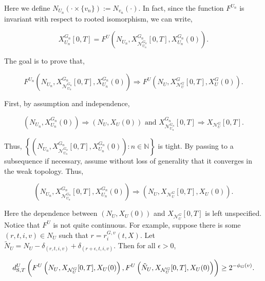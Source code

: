 \documentclass[12pt]{article}
\newcommand{\mb}{\mathbb}
\newcommand{\mc}{\mathcal}
\newcommand{\te}{\text}
\newcommand{\ep}{\epsilon}
\newcommand{\defeq}{:=}								%
\newcommand{\gneigh}[2]{\mc{N}^{#1}_{#2}}			%
\newcommand{\Xf}{X}									%
\newcommand{\poiss}{N}								%
\newcommand{\rate}{r}								%
\newcommand{\stmet}[1]{
\ifstrempty{#1}{
	d_{\te{S}}}{
	d_{\te{S},#1}}}									%
\newcommand{\poissv}[1]{_{#1}}						%
\newcommand{\vind}[1]{_{#1}}						%
\newcommand{\tme}[1]{(#1)}							%
\newcommand{\tmi}[1]{#1}							%
\newcommand{\gind}[1]{^{#1}}						%
\newcommand{\vpara}[1]{^{#1}}						%
\newcommand{\stpara}[1]{_{#1}}						%
\newcommand{\gvpara}[2]{^{#1,#2}}					%
\newcommand{\tmepro}[2]{(#1,#2)}					%
\newcommand{\alt}[1]{\tilde{#1}}					%
\renewcommand{\it}[1]{_{#1}}						%
\begin{document}
Here we define \(\poiss\poissv{U\it{n}}(\cdot\times \{v\it{n}\}) \defeq \poiss\poissv{v\it{n}}(\cdot)\). In fact, since the function \(F\vpara{U\it{n}}\) is invariant with respect to rooted isomorphism, we can write,

\[\Xf\gind{G\it{n}}\vind{U\it{n}}\tmi{[0,T]} = F\vpara{U}\left(\poiss\poissv{U\it{n}}, \Xf\gind{G\it{n}}\vind{\gneigh{G\it{n}}{U\it{n}}}\tmi{[0,T]}, \Xf\gind{G\it{n}}\vind{U\it{n}}\tme{0}\right).\]

The goal is to prove that,

\[F\vpara{U\it{n}}\left(\poiss\poissv{U\it{n}}, \Xf\gind{G\it{n}}\vind{\gneigh{G\it{n}}{U\it{n}}}\tmi{[0,T]}, \Xf\gind{G\it{n}}\vind{U\it{n}}\tme{0}\right) \Rightarrow F\vpara{U}\left(\poiss\poissv{U}, \Xf\gind{G}\vind{\gneigh{G}{U}}\tmi{[0,T]}, \Xf\gind{G}\vind{U}\tme{0}\right).\]

First, by assumption and independence,

\[\left(\poiss\poissv{U\it{n}},\Xf\gind{G\it{n}}\vind{U\it{n}}\tme{0}\right) \Rightarrow\left(\poiss\poissv{U},\Xf\vind{U}\tme{0}\right)\te{ and } \Xf\gind{G\it{n}}\vind{\gneigh{G\it{n}}{U\it{n}}}\tmi{[0,T]} \Rightarrow \Xf\vind{\gneigh{G}{U}}\tmi{[0,T]}.\]

Thus, \(\left\{\left(\poiss\poissv{U\it{n}},\Xf\gind{G\it{n}}\vind{\gneigh{G\it{n}}{U\it{n}}}\tmi{[0,T]},\Xf\gind{G\it{n}}\vind{U\it{n}}\tme{0}\right): n \in \mb{N}\right\}\) is tight. By passing to a subsequence if necessary, assume without loss of generality that it converges in the weak topology. Thus,

\[\left(\poiss\poissv{U\it{n}},\Xf\gind{G\it{n}}\vind{\gneigh{G\it{n}}{U\it{n}}}\tmi{[0,T]},\Xf\gind{G\it{n}}\vind{U\it{n}}\tme{0}\right) \Rightarrow \left(\poiss\poissv{U},\Xf\vind{\gneigh{G}{U}}\tmi{[0,T]},\Xf\vind{U}\tme{0}\right).\]

Here the dependence between \(\left(\poiss\poissv{U},\Xf\vind{U}\tme{0}\right)\) and \(\Xf\vind{\gneigh{G}{U}}\tmi{[0,T]}\) is left unspecified. Notice that \(F\vpara{U}\) is not quite continuous. For example, suppose there is some \((r,t,i,v) \in \poiss\poissv{U}\) such that \(r = \rate\gvpara{G}{v}\stpara{i}\tmepro{t}{\Xf}\). Let \(\alt{\poiss}\poissv{U} = \poiss\poissv{U} - \delta_{(r,t,i,v)} + \delta_{(r+\ep,t,i,v)}\). Then for all \(\ep > 0\),

\[\stmet{T}\vpara{U}\left(F\vpara{U}\left(\poiss\poissv{U},\Xf\vind{\gneigh{G}{U}}\tmi{[0,T]},\Xf\vind{U}\tme{0}\right), F\vpara{U}\left(\alt{\poiss}\poissv{U},\Xf\vind{\gneigh{G}{U}}\tmi{[0,T]},\Xf\vind{U}\tme{0}\right)\right) \geq 2^{-\phi_G(v)}.\]
\end{document}

